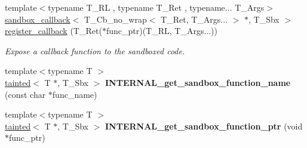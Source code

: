 \begin{DoxyCompactItemize}
\item 
{\footnotesize template$<$typename T\+\_\+\+RL , typename T\+\_\+\+Ret , typename... T\+\_\+\+Args$>$ }\\\hyperlink{classrlbox_1_1sandbox__callback}{sandbox\+\_\+callback}$<$ T\+\_\+\+Cb\+\_\+no\+\_\+wrap$<$ T\+\_\+\+Ret, T\+\_\+\+Args... $>$ $\ast$, T\+\_\+\+Sbx $>$ \hyperlink{classrlbox_1_1rlbox__sandbox_ae4f4cc7825bcb613ab5405e0f6cae7f3}{register\+\_\+callback} (T\+\_\+\+Ret($\ast$func\+\_\+ptr)(T\+\_\+\+RL, T\+\_\+\+Args...))
\begin{DoxyCompactList}\small\item\em Expose a callback function to the sandboxed code. \end{DoxyCompactList}\item 
\mbox{\label{classrlbox_1_1rlbox__sandbox_ad65b42ed5e903655cc23cc9e33672b16}} 
{\footnotesize template$<$typename T $>$ }\\\hyperlink{classrlbox_1_1tainted}{tainted}$<$ T $\ast$, T\+\_\+\+Sbx $>$ {\bfseries I\+N\+T\+E\+R\+N\+A\+L\+\_\+get\+\_\+sandbox\+\_\+function\+\_\+name} (const char $\ast$func\+\_\+name)
\item 
\mbox{\label{classrlbox_1_1rlbox__sandbox_a912906aabd93bf8358153b7a4c7e0adc}} 
{\footnotesize template$<$typename T $>$ }\\\hyperlink{classrlbox_1_1tainted}{tainted}$<$ T $\ast$, T\+\_\+\+Sbx $>$ {\bfseries I\+N\+T\+E\+R\+N\+A\+L\+\_\+get\+\_\+sandbox\+\_\+function\+\_\+ptr} (void $\ast$func\+\_\+ptr)
\end{DoxyCompactItemize}
